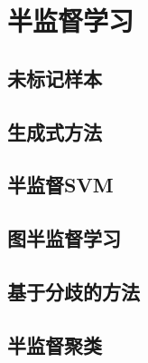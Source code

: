 \newpage
\section{半监督学习}
\subsection{未标记样本}
\subsection{生成式方法}
\subsection{半监督SVM}
\subsection{图半监督学习}
\subsection{基于分歧的方法}
\subsection{半监督聚类}